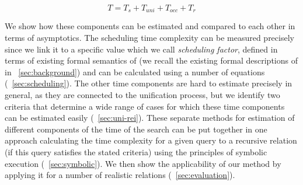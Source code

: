 \[ T = T_s + T_{uni} + T_{occ} + T_r \]

We show how these components can be estimated and compared to each other in terms of asymptotics. The scheduling time complexity can be measured precisely since we link it to a specific value which we
call \emph{scheduling factor}, defined in terms of existing formal semantics of \mK (we recall the existing formal descriptions of \mK in \sectionword~\ref{sec:background}) and can be calculated using
a number of equations (\sectionword~\ref{sec:scheduling}). The other time components are hard to estimate precisely in general, as they are connected to the unification process, but we identify two
criteria that determine a wide range of cases for which these time components can be estimated easily (\sectionword~\ref{sec:uni-rei}). These separate methods for estimation of
different components of the time of the search can be put together in one approach calculating the time complexity for a given query to a recursive relation (if this query satisfies the stated
criteria) using the principles of symbolic execution (\sectionword~\ref{sec:symbolic}). We then show the applicability of our method by applying it for a number of realistic \mK relations (\sectionword~\ref{sec:evaluation}).
